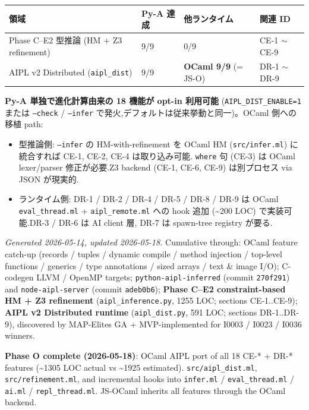 \documentclass[10pt,a4paper,landscape]{article}
\begin{document}
\begin{center}
\begin{tabular}{lll l}
\toprule
領域 & Py-A 達成 & 他ランタイム & 関連 ID \\
\midrule
Phase C--E2 型推論 (HM + Z3 refinement) & 9/9 & 0/9 & CE-1 $\sim$ CE-9 \\
AIPL v2 Distributed (\texttt{aipl\_dist}) & 9/9 & \textbf{OCaml 9/9} (= JS-O) & DR-1 $\sim$ DR-9 \\
\bottomrule
\end{tabular}
\end{center}

\textbf{Py-A 単独で進化計算由来の 18 機能が opt-in 利用可能}
(\texttt{AIPL\_DIST\_ENABLE=1} または \texttt{--check} / \texttt{--infer}
で発火,デフォルトは従来挙動と同一)。OCaml 側への移植 path:

\begin{itemize}\setlength{\itemsep}{0pt}
\item 型推論側: \texttt{--infer} の HM-with-refinement を OCaml HM
  (\texttt{src/infer.ml}) に統合すれば CE-1, CE-2, CE-4 は取り込み可能.
  \texttt{where} 句 (CE-3) は OCaml lexer/parser 修正が必要.Z3 backend
  (CE-1, CE-6, CE-9) は別プロセス via JSON が現実的.
\item ランタイム側: DR-1 / DR-2 / DR-4 / DR-5 / DR-8 / DR-9 は OCaml
  \texttt{eval\_thread.ml} + \texttt{aipl\_remote.ml} への hook 追加
  (\textasciitilde{}200 LOC) で実装可能.DR-3 / DR-6 は AI client 層,
  DR-7 は spawn-tree registry が要る.
\end{itemize}

\bigskip

\noindent
\textit{Generated 2026-05-14, updated 2026-05-18.}
Cumulative through: OCaml feature catch-up (records / tuples / dynamic
compile / method injection / top-level functions / generics / type
annotations / sized arrays / text \& image I/O);
C-codegen LLVM / OpenMP targets;
\texttt{python-aipl-inferred} (commit \texttt{270f291}) and
\texttt{node-aipl-server} (commit \texttt{adeb0b6});
\textbf{Phase C--E2 constraint-based HM + Z3 refinement}
(\texttt{aipl\_inference.py}, 1255 LOC; sections CE-1..CE-9);
\textbf{AIPL v2 Distributed runtime} (\texttt{aipl\_dist.py}, 591 LOC;
sections DR-1..DR-9), discovered by MAP-Elites GA + MVP-implemented for
I0003 / I0023 / I0036 winners.

\textbf{Phase O complete (2026-05-18)}: OCaml AIPL port of all 18
CE-* + DR-* features (\textasciitilde 1305 LOC actual vs \textasciitilde 1925 estimated).
\texttt{src/aipl\_dist.ml}, \texttt{src/refinement.ml}, and
incremental hooks into \texttt{infer.ml} / \texttt{eval\_thread.ml} /
\texttt{ai.ml} / \texttt{repl\_thread.ml}.
JS-OCaml inherits all features through the OCaml backend.
\end{document}
